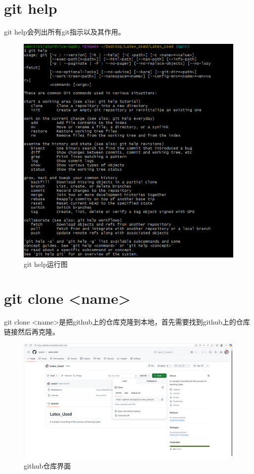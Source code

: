 \documentclass{article}
\begin{document}
\section{git help}
git help会列出所有git指示以及其作用。
\begin{figure}[H]
    \centering
    \includegraphics[width=1\linewidth]{git_help.png}
    \caption{git help运行图}
    \label{fig:help}
\end{figure}

\section{git clone <name>}
git clone <name>是把github上的仓库克隆到本地，首先需要找到github上的仓库链接然后再克隆。
\begin{figure}[H]
    \centering
    \includegraphics[width=1\linewidth]{find_github.png}
    \caption{github仓库界面}
    \label{fig:clone}
\end{figure}
\end{document}
